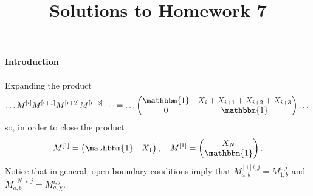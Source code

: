 \documentclass[a4paper,10pt,twoside]{article}
\def \id {{\mathbbm{1}}}
\begin{document}
\title{\vspace{-1cm}\sffamily Solutions to Homework 7\vspace{-1cm}}
\author{}
\date{}
\maketitle
\thispagestyle{fancy}

\begin{section}{}
\paragraph{Introduction} 
Expanding the product 
\[
  \dots M^{[i]} M^{[i+1]} M^{[i+2]} M^{[i+3]} \dots  = 
  \dots
  \begin{pmatrix}
  \id & X_i + X_{i+1} + X_{i+2} + X_{i+3}  \\
  0 & \id
  \end{pmatrix} 
  \dots
\]
so, in order to close the product
\[
  M^{[1]}  = 
  \begin{pmatrix}
  \id & X_1 
  \end{pmatrix},
  \quad
  M^{[1]}  = 
  \begin{pmatrix}
   X_N \\
   \id
  \end{pmatrix}.
\]
Notice that in general, open boundary conditions imply that $M^{[1] i,j}_{a,b} = M^{i,j}_{1,b}$ and $M^{[N] i,j}_{a,b} = M^{i,j}_{a,\chi}$.

\end{section}
\end{document}
